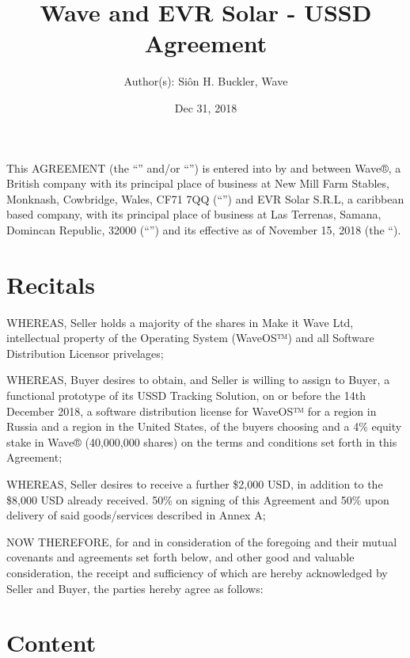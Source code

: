 \documentclass[letterpaper,10pt,english]{sphinxmanual}
\title{Wave and EVR Solar - USSD Agreement}
\date{Dec 31, 2018}
\author{Author(s): Siôn H. Buckler, Wave}
\begin{document}
\maketitle
\sphinxtableofcontents
{}\label{\detokenize{index::doc}}


This AGREEMENT (the “” and/or “”) is entered into by and between Wave®, a British company with its principal place of business at New Mill Farm Stables, Monknash, Cowbridge, Wales, CF71 7QQ (“”)  and EVR Solar S.R.L, a caribbean based company, with its principal place of business at Las Terrenas, Samana, Domincan Republic, 32000  (“”) and its effective as of November 15, 2018 (the “).


\chapter{Recitals}
\label{\detokenize{index:recitals}}
WHEREAS, Seller holds a majority of the shares in Make it Wave Ltd, intellectual property of the Operating System (WaveOS™) and all Software Distribution Licensor privelages;

WHEREAS, Buyer desires to obtain, and Seller is willing to assign to Buyer, a functional prototype of its USSD Tracking Solution, on or before the 14th December 2018, a software distribution license for WaveOS™ for a region in Russia and a region in the United States, of the buyers choosing and a 4\% equity stake in Wave® (40,000,000 shares) on the terms and conditions set forth in this Agreement;

WHEREAS, Seller desires to receive a further \$2,000 USD, in addition to the \$8,000 USD already received. 50\% on signing of this Agreement and 50\% upon delivery of said goods/services described in Annex A;

NOW THEREFORE, for and in consideration of the foregoing and their mutual covenants and agreements set forth below, and other good and valuable consideration, the receipt and sufficiency of which are hereby acknowledged by Seller and Buyer, the parties hereby agree as follows:


\chapter{Content}
\label{\detokenize{index:content}}
\end{document}
